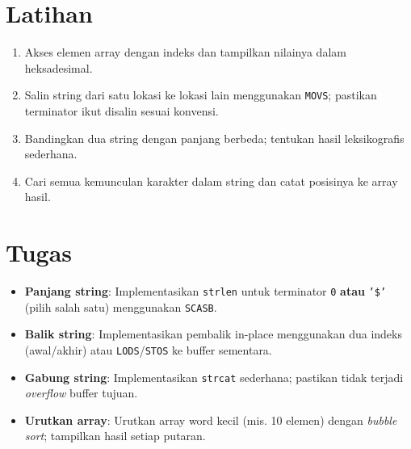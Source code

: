 \section{Latihan}
\begin{enumerate}
  \item Akses elemen array dengan indeks dan tampilkan nilainya dalam heksadesimal.
  \item Salin string dari satu lokasi ke lokasi lain menggunakan \texttt{MOVS}; pastikan terminator ikut disalin sesuai konvensi.
  \item Bandingkan dua string dengan panjang berbeda; tentukan hasil leksikografis sederhana.
  \item Cari semua kemunculan karakter dalam string dan catat posisinya ke array hasil.
\end{enumerate}

\section{Tugas}
\begin{itemize}
  \item \textbf{Panjang string}: Implementasikan \texttt{strlen} untuk terminator \texttt{0} \textbf{atau} \texttt{'{\$}'} (pilih salah satu) menggunakan \texttt{SCASB}.
  \item \textbf{Balik string}: Implementasikan pembalik in-place menggunakan dua indeks (awal/akhir) atau \texttt{LODS}/\texttt{STOS} ke buffer sementara.
  \item \textbf{Gabung string}: Implementasikan \texttt{strcat} sederhana; pastikan tidak terjadi \textit{overflow} buffer tujuan.
  \item \textbf{Urutkan array}: Urutkan array word kecil (mis. 10 elemen) dengan \textit{bubble sort}; tampilkan hasil setiap putaran.
\end{itemize}

